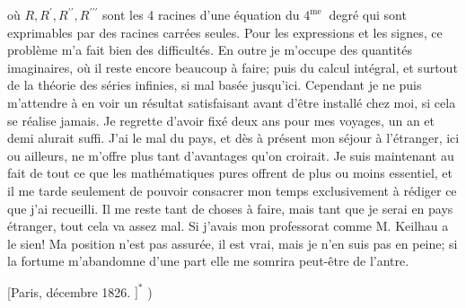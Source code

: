 \documentclass{article}
\begin{document}
où \(R, R^{\prime}, R^{\prime \prime}, R^{\prime \prime \prime}\) sont les 4 racines d'une équation du \(4^{\text {me }}\) degré qui sont exprimables par des racines carrées seules. Pour les expressions et les signes, ce problème m'a fait bien des difficultés. En outre je m'occupe des quantités imaginaires, où il reste encore beaucoup à faire; puis du calcul intégral, et surtout de la théorie des séries infinies, si mal basée jusqu'ici. Cependant je ne puis m'attendre à en voir un résultat satisfaisant avant d'être installé chez moi, si cela se réalise jamais. Je regrette d'avoir fixé deux ans pour mes voyages, un an et demi alurait suffi. J'ai le mal du pays, et dès à présent mon séjour à l'étranger, ici ou ailleurs, ne m'offre plus tant d'avantages qu'on croirait. Je suis maintenant au fait de tout ce que les mathématiques pures offrent de plus ou moins essentiel, et il me tarde seulement de pouvoir consacrer mon temps exclusivement à rédiger ce que j'ai recueilli. Il me reste tant de choses à faire, mais tant que je serai en pays étranger,
tout cela va assez mal. Si j'avais mon professorat comme M. Keilhau a le sien! Ma position n'est pas assurée, il est vrai, mais je n'en suis pas en peine; si la fortume m'abandomne d'une part elle me somrira peut-être de l'antre.

[Paris, décembre 1826. \(]^{*}\) )
\end{document}
